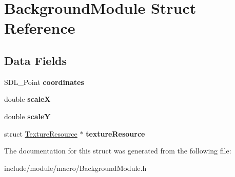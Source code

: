 \hypertarget{struct_background_module}{}\section{Background\+Module Struct Reference}
\label{struct_background_module}
\subsection*{Data Fields}
\begin{DoxyCompactItemize}
\item 
\hypertarget{struct_background_module_a667ad041f76f3b99c2ea65cd78b668ea}{}\label{struct_background_module_a667ad041f76f3b99c2ea65cd78b668ea} 
S\+D\+L\+\_\+\+Point {\bfseries coordinates}
\item 
\hypertarget{struct_background_module_af04d6c916584bdddd6a334359ff1059d}{}\label{struct_background_module_af04d6c916584bdddd6a334359ff1059d} 
double {\bfseries scaleX}
\item 
\hypertarget{struct_background_module_a936cc64e631dcd2b4ea124d5d8d4fe38}{}\label{struct_background_module_a936cc64e631dcd2b4ea124d5d8d4fe38} 
double {\bfseries scaleY}
\item 
\hypertarget{struct_background_module_aedd0da0c072332f83e64105f8682bbdf}{}\label{struct_background_module_aedd0da0c072332f83e64105f8682bbdf} 
struct \hyperlink{struct_texture_resource}{Texture\+Resource} $\ast$ {\bfseries texture\+Resource}
\end{DoxyCompactItemize}


The documentation for this struct was generated from the following file\+:\begin{DoxyCompactItemize}
\item 
include/module/macro/Background\+Module.\+h\end{DoxyCompactItemize}
